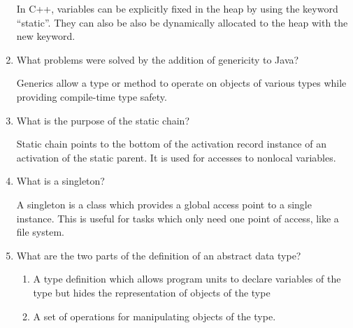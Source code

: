 \begin{enumerate}
    \begin{answer}
    In C++, variables can be explicitly fixed in the heap by using the keyword “static”. They can also be also be dynamically allocated to the heap with the new keyword.
    \end{answer}

  \item What problems were solved by the addition
    of genericity to Java?
    
    \begin{answer}
    
    Generics allow a type or method to operate on objects of various types while providing compile-time type safety.
    
    \end{answer}

  \item What is the purpose of the static chain?
  
  \begin{answer}
  
  Static chain points to the bottom of the activation record instance of an activation of the static parent. It is used for accesses to nonlocal variables. 
  
  \end{answer}

  \item What is a singleton?
  
  \begin{answer}
  
  A singleton is a class which provides a global access point to a single instance. This is useful for tasks which only need one point of access, like a file system.

  \end{answer}

  \item What are the two parts of the definition 
    of an abstract data type?
    
    \begin{answer}
    \begin{enumerate}
\item{A type definition which allows program units to declare variables of the type but hides the representation of objects of the type}
\item{A set of operations for manipulating objects of the type.}
	\end{enumerate}
    \end{answer}
\end{enumerate}


